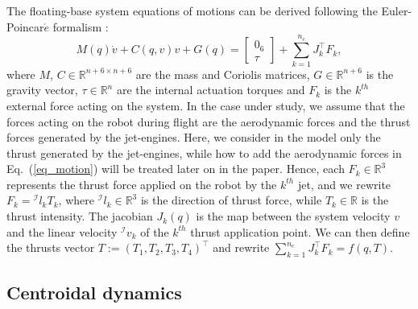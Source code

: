The floating-base system equations of motions can be derived following the Euler-Poincar$\acute{e}$ formalism \cite{marsden2013introduction}:
\begin{equation}
\label{eq_motion}
M(q)\dot{v}+C(q,v)v+G(q)=
\begin{bmatrix}
0_6\\
\tau
\end{bmatrix}
+\sum_{k=1}^{n_c}J_k^{\top} F_k ,
\end{equation}
where $M$, $C \in \mathbb{R}^{n+6\times n+6}$ are the mass and Coriolis matrices, $G \in \mathbb{R}^{n+6}$ is the gravity vector, $\tau \in \mathbb{R}^n$ are the internal actuation torques and $F_k$ is the $k^{th}$ external force acting on the system. In the case under study, we assume that the forces acting on the robot during flight are the aerodynamic forces and the thrust forces generated by the jet-engines. Here, we consider in the model only the thrust generated by the jet-engines, while how to add the aerodynamic forces in Eq.~(\ref{eq_motion}) will be treated later on in the paper. Hence, each $F_k \in \mathbb{R}^3$ represents the thrust force applied on the robot by the $k^{th}$ jet, and we rewrite $F_k={}^\mathcal{I}l_k T_k$, where ${}^\mathcal{I}l_k \in \mathbb{R}^3$ is the direction of thrust force, while $T_k \in \mathbb{R}$ is the thrust intensity. The jacobian $J_k(q)$ is the map between the system velocity $v$ and the linear velocity ${}^\mathcal{I} v_k$ of the $k^{th}$ thrust application point. We can then define the thrusts vector $T:=(T_1, T_2, T_3, T_4)^{\top}$ and rewrite $\sum^{n_c}_{k=1}J_k^{\top}F_k = f(q,T)$.

\subsection{Centroidal dynamics}\label{sec:intro_momentum}

